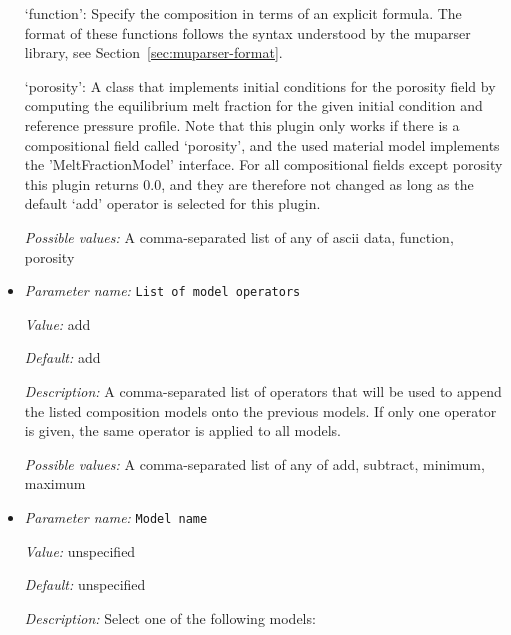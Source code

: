 \begin{itemize}
`function': Specify the composition in terms of an explicit formula. The format of these functions follows the syntax understood by the muparser library, see Section~\ref{sec:muparser-format}.

`porosity': A class that implements initial conditions for the porosity field by computing the equilibrium melt fraction for the given initial condition and reference pressure profile. Note that this plugin only works if there is a compositional field called `porosity', and the used material model implements the 'MeltFractionModel' interface. For all compositional fields except porosity this plugin returns 0.0, and they are therefore not changed as long as the default `add' operator is selected for this plugin.


{\it Possible values:} A comma-separated list of any of ascii data, function, porosity
\item {\it Parameter name:} {\tt List of model operators}
\label{parameters:Initial composition model/List of model operators}


{\it Value:} add


{\it Default:} add


{\it Description:} A comma-separated list of operators that will be used to append the listed composition models onto the previous models. If only one operator is given, the same operator is applied to all models.


{\it Possible values:} A comma-separated list of any of add, subtract, minimum, maximum
\item {\it Parameter name:} {\tt Model name}
\label{parameters:Initial composition model/Model name}


{\it Value:} unspecified


{\it Default:} unspecified


{\it Description:} Select one of the following models:


\end{itemize}

